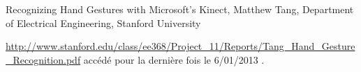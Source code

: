 \begin{thebibliography}{9}


Recognizing Hand Gestures with Microsoft's Kinect, Matthew Tang, Department of Electrical Engineering, Stanford University

\url{http://www.stanford.edu/class/ee368/Project_11/Reports/Tang_Hand_Gesture_Recognition.pdf} accédé pour la dernière fois le 6/01/2013 .

\end{thebibliography}